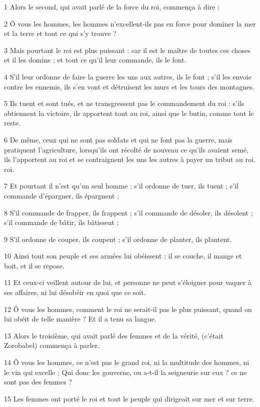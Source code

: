 \par 1 Alors le second, qui avait parlé de la force du roi, commença à dire :
\par 2 Ô vous les hommes, les hommes n'excellent-ils pas en force pour dominer la mer et la terre et tout ce qui s'y trouve ?
\par 3 Mais pourtant le roi est plus puissant : car il est le maître de toutes ces choses et il les domine ; et tout ce qu'il leur commande, ils le font.
\par 4 S'il leur ordonne de faire la guerre les uns aux autres, ils le font ; s'il les envoie contre les ennemis, ils s'en vont et détruisent les murs et les tours des montagnes.
\par 5 Ils tuent et sont tués, et ne transgressent pas le commandement du roi : s'ils obtiennent la victoire, ils apportent tout au roi, ainsi que le butin, comme tout le reste.
\par 6 De même, ceux qui ne sont pas soldats et qui ne font pas la guerre, mais pratiquent l'agriculture, lorsqu'ils ont récolté de nouveau ce qu'ils avaient semé, ils l'apportent au roi et se contraignent les uns les autres à payer un tribut au roi. roi.
\par 7 Et pourtant il n'est qu'un seul homme : s'il ordonne de tuer, ils tuent ; s'il commande d'épargner, ils épargnent ;
\par 8 S'il commande de frapper, ils frappent ; s'il commande de désoler, ils désolent ; s’il commande de bâtir, ils bâtissent ;
\par 9 S'il ordonne de couper, ils coupent ; s'il ordonne de planter, ils plantent.
\par 10 Ainsi tout son peuple et ses armées lui obéissent ; il se couche, il mange et boit, et il se repose.
\par 11 Et ceux-ci veillent autour de lui, et personne ne peut s'éloigner pour vaquer à ses affaires, ni lui désobéir en quoi que ce soit.
\par 12 Ô vous les hommes, comment le roi ne serait-il pas le plus puissant, quand on lui obéit de telle manière ? Et il a tenu sa langue.
\par 13 Alors le troisième, qui avait parlé des femmes et de la vérité, (c'était Zorobabel) commença à parler.
\par 14 Ô vous les hommes, ce n'est pas le grand roi, ni la multitude des hommes, ni le vin qui excelle ; Qui donc les gouverne, ou a-t-il la seigneurie sur eux ? ce ne sont pas des femmes ?
\par 15 Les femmes ont porté le roi et tout le peuple qui dirigeait sur mer et sur terre.
